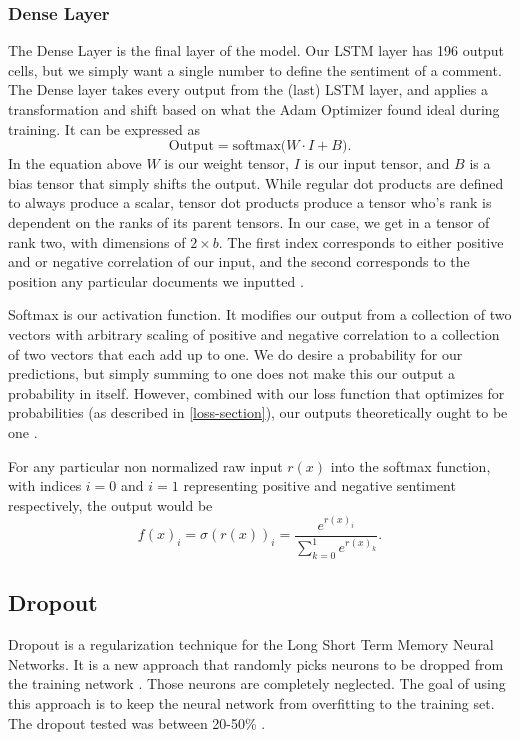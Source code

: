 \documentclass[titlepage,letterpaper]{article}
\begin{document}
\subsubsection{Dense Layer}
The Dense Layer is the final layer of the model. Our LSTM layer has 196 output cells, but we simply want a single number to define the sentiment of a comment.  The Dense layer takes every output from the (last) LSTM layer, and applies a transformation and shift based on what the Adam Optimizer found ideal during training. It can be expressed as
\[ \text{Output} = \text{softmax(} W \cdot I + B ). \]
In the equation above \(W\) is our weight tensor, \(I\) is our input tensor, and \(B\) is a bias tensor that simply shifts the output. While regular dot products are defined to always produce a scalar, tensor dot products produce a tensor who's rank is dependent on the ranks of its parent tensors. In our case, we get in a tensor of rank two, with dimensions of \(2\times b.\) The first index corresponds to either positive and or negative correlation of our input, and the second corresponds to the position any particular documents we inputted \cite{tensors, tensorflow}.

Softmax is our activation function. It modifies our output from a collection of two vectors  with arbitrary scaling of positive and negative correlation to a collection of two vectors that each add up to one. We do desire a probability for our predictions, but simply summing to one does not make this our output a probability in itself. However, combined with our loss function that optimizes for probabilities (as described in \cref{loss-section}), our outputs theoretically ought to  be one \cite{NeuralNet,tensorflow}.

For any particular non normalized raw input \(r(x)\)  into the softmax function, with indices \(i=0\)  and \(i=1\) representing positive and negative sentiment respectively, the output would be \cite{NeuralNet}
\[f(x)_i = \sigma(r(x))_i  = \frac{e^{r(x)_i}}{\sum_{k=0}^1 e^{r (x)_k}}.\]


\subsection{Dropout}
Dropout is a regularization technique for the Long Short Term Memory Neural Networks. It is a new approach that randomly picks neurons to be dropped from the training network \cite{NeuralNet}. Those neurons are completely neglected. The goal of using this approach is to keep the neural network from overfitting to the training set. The dropout tested was between 20-50\% \cite{NeuralNet}.
\end{document}
